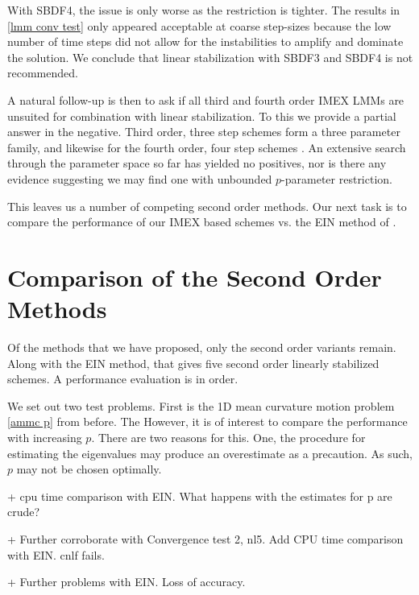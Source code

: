With SBDF4, the issue is only worse as the restriction is tighter. The results in \cref{lmm conv test} only appeared acceptable at coarse step-sizes because the low number of time steps did not allow for the instabilities to amplify and dominate the solution. We conclude that linear stabilization with SBDF3 and SBDF4  is not recommended. 

A natural follow-up is then to ask if all third and fourth order IMEX LMMs are unsuited for combination with linear stabilization. To this we provide a partial answer in the negative. Third order, three step schemes form a three parameter family, and likewise for the fourth order, four step schemes \cite{ascher1995implicit}. An extensive search through the parameter space so far has yielded no positives, nor is there any evidence suggesting we may find one with unbounded $p$-parameter restriction.

This leaves us a number of competing second order methods. Our next task is to compare the performance of our IMEX based schemes vs. the EIN method of \cite{duchemin2014explicit}.

\section{Comparison of the Second Order Methods}
Of the methods that we have proposed, only the second order variants remain. Along with the EIN method, that gives five second order linearly stabilized schemes. A performance evaluation is in order.

We set out two test problems. First is the 1D mean curvature motion problem \cref{ammc p} from before. The 
However, it is of interest to compare the performance with increasing $p$. There are two reasons for this. One, the procedure for estimating the eigenvalues may produce an overestimate as a precaution. As such, $p$ may not be chosen optimally.  

\clearpage

+ cpu time comparison with EIN. What happens with the estimates for p are crude?

+ Further corroborate with Convergence test 2, nl5. Add CPU time comparison with EIN. cnlf fails. 

+ Further problems with EIN. Loss of accuracy.

